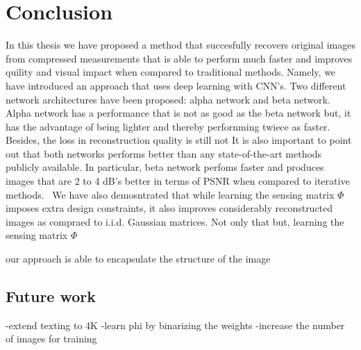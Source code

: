 \chapter{Conclusion}
In this thesis we have proposed a method that succesfully recovers original images from compressed measurements that is able to perform much faster and improves quility and visual impact when compared to traditional methods. Namely, we have introduced an approach that uses deep learning with CNN's. Two different network architectures have been proposed: alpha network and beta network. Alpha network has a performance that is not as good as the beta network but, it has the advantage of being lighter and thereby perfornming twiece as faster. Besides, the loss in reconstruction quality is still not
 It is also important to point out that both networks performs better than any state-of-the-art methods publicly available. In particular, beta network perfoms faster and produces images that are 2 to 4 dB's better in terms of PSNR when compared to iterative methods.   \
We have also demosntrated that while learning the sensing matrix $\Phi$ imposes extra design constraints, it also improves considerably reconstructed images as compraed to i.i.d. Gaussian matrices. Not only that but, learning the sensing matrix $\Phi$  



our approach is able to encapsulate the structure of the image
\section{Future work}

-extend texting to 4K
-learn phi by binarizing the weights
-increase the number of images for training



